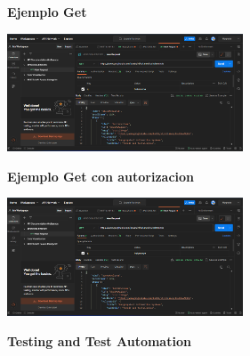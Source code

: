 \documentclass[twoside,twocolumn]{article}
\begin{document}
 \textbf{Ejemplo Get}
\begin{center}
	\includegraphics[width=7cm]{./Imagenes/postmanexample} 
\end{center}

\textbf{Ejemplo Get con autorizacion}
\begin{center}
	\includegraphics[width=7cm]{./Imagenes/postmanexample} 
\end{center}

 \textbf{Testing and Test Automation}
 
\end{document}
